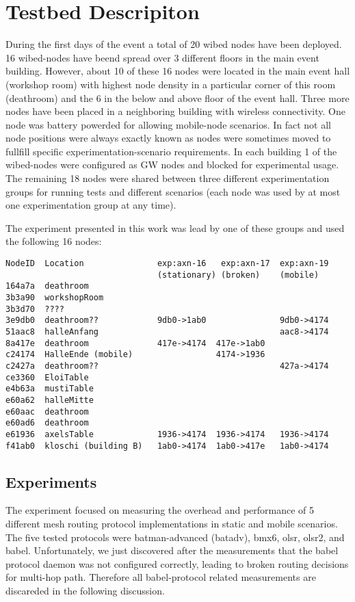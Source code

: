 \documentclass[a4paper,12pt,twoside]{article}
\begin{document}
\section{Testbed Descripiton}


During the first days of the event a total of 20 wibed nodes have been
deployed. 16 wibed-nodes have beend spread over 3 different floors in
the main event building. However, about 10 of these 16 nodes were
located in the main event hall (workshop room) with highest node
density in a particular corner of this room (deathroom) and the 6 in
the below and above floor of the event hall. Three more nodes have
been placed in a neighboring building with wireless connectivity.  One
node was battery powerded for allowing mobile-node scenarios.  In fact
not all node positions were always exactly known as nodes were
sometimes moved to fullfill specific experimentation-scenario
requirements.  In each building 1 of the wibed-nodes were configured
as GW nodes and blocked for experimental usage. The remaining 18 nodes
were shared between three different experimentation groups for running
tests and different scenarios (each node was used by at most one
experimentation group at any time).

The experiment presented in this work was lead by one of these groups
and used the following 16 nodes:

\scriptsize
\begin{verbatim}
NodeID  Location               exp:axn-16   exp:axn-17  exp:axn-19
                               (stationary) (broken)    (mobile)
164a7a  deathroom
3b3a90  workshopRoom
3b3d70  ????
3e9db0  deathroom??            9db0->1ab0               9db0->4174
51aac8  halleAnfang                                     aac8->4174
8a417e  deathroom              417e->4174  417e->1ab0 
c24174  HalleEnde (mobile)                 4174->1936 
c2427a  deathroom??                                     427a->4174
ce3360  EloiTable
e4b63a  mustiTable
e60a62  halleMitte
e60aac  deathroom
e60ad6  deathroom
e61936  axelsTable             1936->4174  1936->4174   1936->4174
f41ab0  kloschi (building B)   1ab0->4174  1ab0->417e   1ab0->4174
\end{verbatim}
\normalsize


\subsection{Experiments}

The experiment focused on measuring the overhead and performance of 5
different mesh routing protocol implementations in static and mobile
scenarios. The five tested protocols were batman-advanced (batadv),
bmx6, olsr, olsr2, and babel. Unfortunately, we just discovered after
the measurements that the babel protocol daemon was not configured
correctly, leading to broken routing decisions for multi-hop
path. Therefore all babel-protocol related measurements are discareded
in the following discussion.
\end{document}
